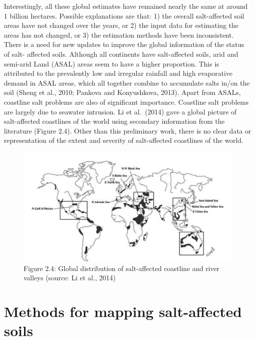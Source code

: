 \documentclass[
  10pt,
  b5paper,
]{book}
\begin{document}
Interestingly, all these global estimates have remained nearly the same at around 1 billion hectares. Possible explanations are that: 1) the overall salt-affected soil areas have not changed over the years, or
2) the input data for estimating the areas has not changed, or 3) the estimation methods have been inconsistent. There is a need for new updates to improve the global information of the status of salt- affected soils.
Although all continents have salt-affected soils, arid and semi-arid Land (ASAL) areas seem to have a higher proportion. This is attributed to the prevalently low and irregular rainfall and high evaporative demand in ASAL areas, which all together combine to accumulate salts in/on the soil (Sheng et al., 2010; Pankova and Konyushkova, 2013).
Apart from ASALs, coastline salt problems are also of significant importance. Coastline salt problems are largely due to seawater intrusion. Li et al.~(2014) gave a global picture of salt-affected coastlines of the world using secondary information from the literature (Figure 2.4). Other than this preliminary work, there is no clear data or representation of the extent and severity of salt-affected coastlines of the world.

\begin{figure}
\centering
\includegraphics{figures/images/Figure2.4.jpg}
\caption{Figure 2.4: Global distribution of salt-affected coastline and river valleys (source: Li et al., 2014)}
\end{figure}

\hypertarget{methods-for-mapping-salt-affected-soils}{%
\chapter{Methods for mapping salt-affected soils}\label{methods-for-mapping-salt-affected-soils}}
\end{document}
